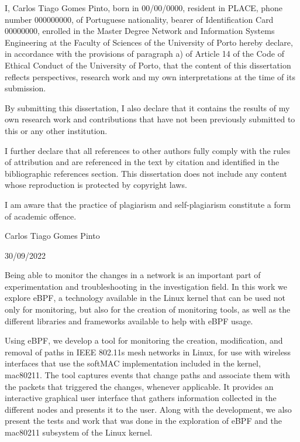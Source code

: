 
I, Carlos Tiago Gomes Pinto, born in 00/00/0000, resident in PLACE, phone number
000000000, of Portuguese nationality, bearer of Identification Card 00000000,
enrolled in the Master Degree Network and Information Systems Engineering at the
Faculty of Sciences of the University of Porto hereby declare, in accordance
with the provisions of paragraph a) of Article 14 of the Code of Ethical Conduct
of the University of Porto, that the content of this dissertation reflects
perspectives, research work and my own interpretations at the time of its
submission.

By submitting this dissertation, I also declare that it contains the results of
my own research work and contributions that have not been previously submitted
to this or any other institution.

I further declare that all references to other authors fully comply with the
rules of attribution and are referenced in the text by citation and identified
in the bibliographic references section. This dissertation does not include any
content whose reproduction is protected by copyright laws.

I am aware that the practice of plagiarism and self-plagiarism constitute a form
of academic offence.

Carlos Tiago Gomes Pinto

30/09/2022



Being able to monitor the changes in a network is an important part of
experimentation and troubleshooting in the investigation field. In this work we
explore eBPF, a technology available in the Linux kernel that can be used not
only for monitoring, but also for the creation of monitoring tools, as well as
the different libraries and frameworks available to help with eBPF usage.

Using eBPF, we develop a tool for monitoring the creation, modification, and
removal of paths in \ac{IEEE} 802.11s mesh networks in Linux, for use with
wireless interfaces that use the softMAC implementation included in the kernel,
mac80211. The tool captures events that change paths and associate them with the
packets that triggered the changes, whenever applicable. It provides an
interactive graphical user interface that gathers information collected in the
different nodes and presents it to the user. Along with the development, we also
present the tests and work that was done in the exploration of eBPF and the
mac80211 subsystem of the Linux kernel.


